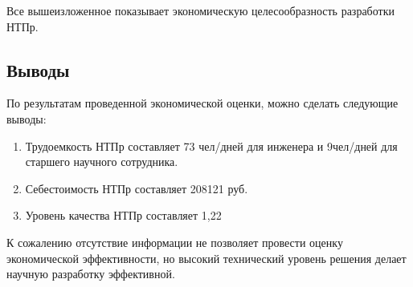 Все вышеизложенное показывает экономическую целесообразность разработки НТПр.

\subsection*{Выводы}

По результатам проведенной экономической оценки, можно сделать следующие выводы:

\begin{enumerate}
  \item Трудоемкость НТПр составляет 73 чел/дней для инженера и 9чел/дней для старшего научного сотрудника.
  \item Себестоимость НТПр составляет 208121 руб.
  \item Уровень качества НТПр составляет 1,22
\end{enumerate}

К сожалению отсутствие информации не позволяет провести оценку экономической эффективности, но высокий технический уровень решения делает научную разработку эффективной.

